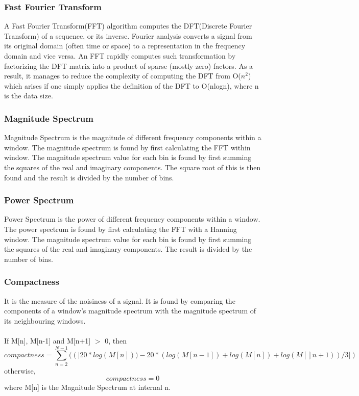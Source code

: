 \subsubsection{Fast Fourier Transform}
A Fast Fourier Transform(FFT) algorithm computes the DFT(Discrete Fourier Transform) of a sequence, or its inverse. Fourier analysis converts a signal from its original domain (often time or space) to a representation in the frequency domain and vice versa. An FFT rapidly computes such transformation by factorizing the DFT matrix into a product of sparse (mostly zero) factors. As a result, it manages to reduce the complexity of computing the DFT from O($n^2$) which arises if one simply applies the definition of the DFT to O(nlogn), where n is the data size. 

\subsubsection{Magnitude Spectrum}
Magnitude Spectrum is the magnitude of different frequency components within a window. The magnitude spectrum is found by first calculating the FFT within window. The magnitude spectrum value for each bin is found by first summing the squares of the real and imaginary components. The square root of this is then found and the result is divided by the number of bins.

\subsubsection{Power Spectrum}
Power Spectrum is the power of different frequency components within a window. The power spectrum is found by first calculating the FFT with a Hanning window. The magnitude spectrum value for each bin is found by first summing the squares of the real and imaginary components. The result is divided by the number of bins.

\subsubsection{Compactness}
It is the measure of the noisiness of a signal. It is found by comparing the 
components of a window’s magnitude spectrum with the magnitude spectrum of its  
neighbouring windows.\\ 
\\
If M[n], M[n-1] and M[n+1] $>$ 0, then
\begin{equation}
        compactness = \sum_{n=2}^{N-1}{((|20*log(M[n]))-20*(log(M[n-1])+log(M[n])+log(M[]n+1))/3|)}
\end{equation}
otherwise,
\begin{equation}
        compactness = 0
\end{equation}
where M[n] is the Magnitude Spectrum at internal n.

